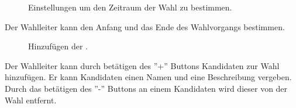 \documentclass[parskip=full,11pt,twoside]{scrartcl}
\begin{document}
\begin{figure}[H]
	\caption{\label{fig:wlltr-time}
		Einstellungen um den Zeitraum der Wahl zu bestimmen.
	}
\end{figure}
Der Wahlleiter kann den Anfang und das Ende des Wahlvorgangs bestimmen.

\begin{figure}[H]
	\caption{\label{fig:wlltr-candidate}
		Hinzufügen der .
	}
\end{figure}
Der Wahlleiter kann durch betätigen des ''+'' Buttons Kandidaten zur Wahl hinzufügen.
Er kann Kandidaten einen Namen und eine Beschreibung vergeben.
Durch das betätigen des ''-'' Buttons an einem Kandidaten wird dieser von der Wahl entfernt.
\end{document}

